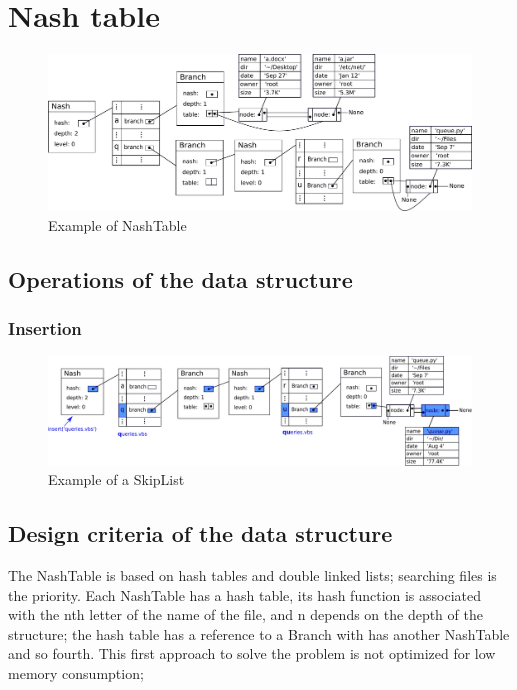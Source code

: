 \documentclass{sig-alternate-05-2015}
\begin{document}
  \section{Nash table}
  \begin{figure}[t]
    \centering
    \includegraphics[scale=0.4]{NashTable.pdf}
    \caption{Example of NashTable}
    \label{img:nashT}
  \end{figure}

  \subsection{Operations of the data structure}

    \subsubsection{Insertion}
    \begin{figure}[t]
      \centering
      \includegraphics[scale=0.4]{NashInsert.pdf}
      \caption{Example of a SkipList}
      \label{img:nashInsert}
    \end{figure}

  \subsection{Design criteria of the data structure}
    The NashTable is based on hash tables and double linked lists; searching files
    is the priority. Each NashTable has a hash table, its hash function is associated with the
    nth letter of the name of the file, and n depends on the depth of the structure;
    the hash table has a reference to a Branch with has another NashTable and so fourth.
    This first approach to solve the problem is not optimized for low memory consumption;



  
  
\end{document}
